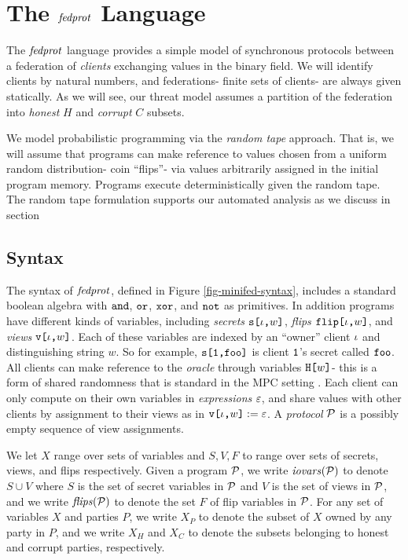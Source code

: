 \section{The $\mathit{fedprot}$ Language}

The $\mathit{fedprot}$ language provides a simple model of synchronous
protocols between a federation of \emph{clients} exchanging values in
the binary field. We will identify clients by natural numbers, and
federations- finite sets of clients- are always given statically.
As we will see, our threat model assumes a partition of the federation
into \emph{honest} $H$ and \emph{corrupt} $C$ subsets.

We model probabilistic programming via the \emph{random tape}
approach. That is, we will assume that programs can make reference to
values chosen from a uniform random distribution- coin ``flips''- via
values arbitrarily assigned in the initial program memory.  Programs
execute deterministically given the random tape. The random tape
formulation supports our automated analysis as we discuss in
section 

\subsection{Syntax} The syntax of $\mathit{fedprot}$, defined in
Figure \ref{fig-minifed-syntax}, includes a standard
boolean algebra with $\texttt{and}$, $\texttt{or}$, $\texttt{xor}$, and $\texttt{not}$ as
primitives. In addition programs have different kinds of variables,
including \emph{secrets} $\texttt{s[}\iota\texttt{,}w\texttt{]}$, \emph{flips}
$\texttt{flip[}\iota\texttt{,}w\texttt{]}$, and \emph{views} $\texttt{v[}\iota\texttt{,}w\texttt{]}$.  Each of these
variables are indexed by an ``owner'' client $\iota$ and distinguishing
string $w$. So for example, $\texttt{s[}\texttt{1}\texttt{,}\texttt{foo}\texttt{]}$ is client
$\texttt{1}$'s secret called $\texttt{foo}$. All clients can make reference
to the \emph{oracle} through variables $\texttt{H[}w\texttt{]}$- this is a form
of shared randomness that is standard in the MPC setting \cite{XXX}.
Each client can only compute on their own variables in
\emph{expressions} $\varepsilon$, and share values with other clients by
assignment to their views as in $\texttt{v[}\iota\texttt{,}w\texttt{]} := \varepsilon$.  A
\emph{protocol} $\mathcal{P}$ is a possibly empty sequence of view
assignments.

We let $X$ range over sets of variables and $S,V,F$ to range over sets
of secrets, views, and flips respectively. Given a program $\mathcal{P}$, we
write $\mathit{iovars}(\mathcal{P})$ to denote $S \cup V$ where $S$ is the set of
secret variables in $\mathcal{P}$ and $V$ is the set of views in $\mathcal{P}$,
and we write $\mathit{flips}(\mathcal{P})$ to denote the set $F$ of flip variables
in $\mathcal{P}$. For any set of variables $X$ and parties $P$, we write
$X_P$ to denote the subset of $X$ owned by any party in $P$, and we
write $X_H$ and $X_C$ to denote the subsets belonging to honest and
corrupt parties, respectively.

